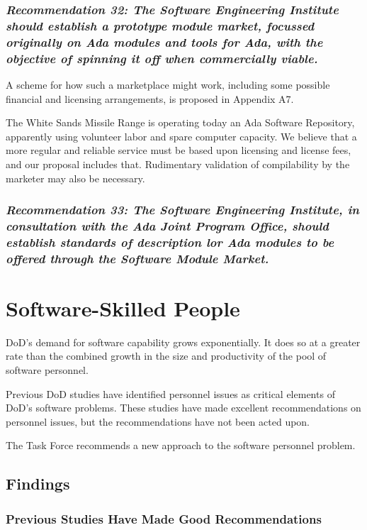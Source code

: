 \documentclass[12pt]{article}
\begin{document}
\subsubsection*{\textit{Recommendation 32: The Software Engineering Institute
should establish a prototype module market, focussed originally on Ada modules
and tools for Ada, with the objective of spinning it off when commercially
viable.}}

A scheme for how such a marketplace might work, including some possible
financial and licensing arrangements, is proposed in Appendix A7.

The White Sands Missile Range is operating today an Ada Software Repository,
apparently using volunteer labor and spare computer capacity. We believe that a
more regular and reliable service must be based upon licensing and license
fees, and our proposal includes that. Rudimentary validation of compilability
by the marketer may also be necessary.

\subsubsection*{\textit{Recommendation 33: The Software Engineering Institute,
in consultation with the Ada Joint Program Office, should establish standards
of description lor Ada modules to be offered through the Software Module
Market.}}

\section{Software-Skilled People}

DoD's demand for software capability grows exponentially. It does so at a
greater rate than the combined growth in the size and productivity of the pool
of software personnel.

Previous DoD studies have identified personnel issues as critical elements of
DoD's software problems. These studies have made excellent recommendations on
personnel issues, but the recommendations have not been acted upon.

The Task Force recommends a new approach to the software personnel problem.

\subsection*{Findings}

\subsubsection*{Previous Studies Have Made Good Recommendations}
\end{document}
